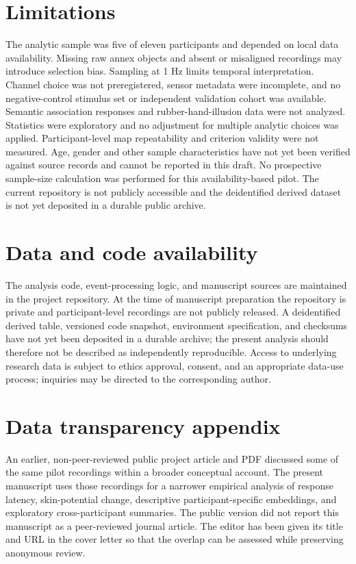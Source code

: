 \documentclass[a4paper,12pt]{article}
\begin{document}
\section{Limitations}
The analytic sample was five of eleven participants and depended on local data availability. Missing raw annex objects and absent or misaligned recordings may introduce selection bias. Sampling at 1 Hz limits temporal interpretation. Channel choice was not preregistered, sensor metadata were incomplete, and no negative-control stimulus set or independent validation cohort was available. Semantic association responses and rubber-hand-illusion data were not analyzed. Statistics were exploratory and no adjustment for multiple analytic choices was applied. Participant-level map repeatability and criterion validity were not measured. Age, gender and other sample characteristics have not yet been verified against source records and cannot be reported in this draft. No prospective sample-size calculation was performed for this availability-based pilot. The current repository is not publicly accessible and the deidentified derived dataset is not yet deposited in a durable public archive.

\section{Data and code availability}
The analysis code, event-processing logic, and manuscript sources are maintained in the project repository. At the time of manuscript preparation the repository is private and participant-level recordings are not publicly released. A deidentified derived table, versioned code snapshot, environment specification, and checksums have not yet been deposited in a durable archive; the present analysis should therefore not be described as independently reproducible. Access to underlying research data is subject to ethics approval, consent, and an appropriate data-use process; inquiries may be directed to the corresponding author.

\section*{Data transparency appendix}
An earlier, non-peer-reviewed public project article and PDF discussed some of the same pilot recordings within a broader conceptual account. The present manuscript uses those recordings for a narrower empirical analysis of response latency, skin-potential change, descriptive participant-specific embeddings, and exploratory cross-participant summaries. The public version did not report this manuscript as a peer-reviewed journal article. The editor has been given its title and URL in the cover letter so that the overlap can be assessed while preserving anonymous review.
\end{document}
